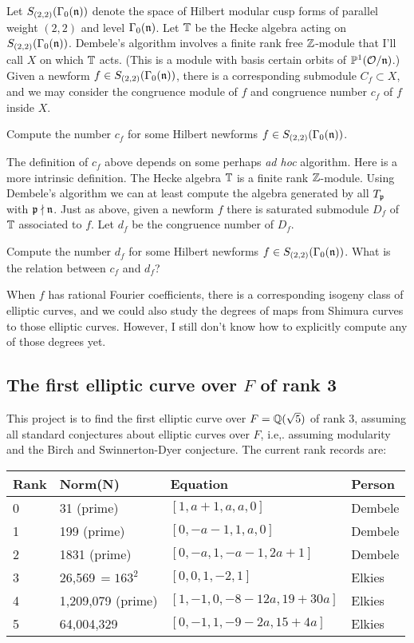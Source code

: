 \documentclass{article}
\begin{document}
Let $S_{(2,2)}(\Gamma_0(\mathfrak{n}))$ denote the space of Hilbert modular cusp forms of
parallel weight $(2,2)$ and level $\Gamma_0(\mathfrak{n})$.  Let $\mathbb{T}$ be the Hecke algebra
acting on $S_{(2,2)}(\Gamma_0(\mathfrak{n}))$.   Dembele's algorithm involves a finite
rank free $\mathbb{Z}$-module that I'll call $X$ on which $\mathbb{T}$ acts. 
(This is a module with basis certain orbits of $\mathbb{P}^1(\mathcal{O}/\mathfrak{n})$.)
Given a newform $f\in S_{(2,2)}(\Gamma_0(\mathfrak{n}))$, there is a corresponding
submodule $C_f \subset X$, and we may consider the congruence module
of $f$ 
and congruence number $c_f$ of $f$ inside $X$.

\vspace{1em}
 Compute the number $c_f$ for some Hilbert
newforms $f \in S_{(2,2)}(\Gamma_0(\mathfrak{n}))$.
\vspace{1em}


The definition of $c_f$ above depends on some perhaps {\em ad hoc}
algorithm.  Here is a more intrinsic definition.  The Hecke algebra
$\mathbb{T}$ is a finite rank $\mathbb{Z}$-module.  Using Dembele's algorithm we can
at least compute the algebra generated by all $T_{\mathfrak{p}}$ with
$\mathfrak{p}\nmid\mathfrak{n}$.  Just as above, given a newform $f$ there is saturated
submodule $D_f$ of $\mathbb{T}$ associated to $f$.  Let $d_f$ be the
congruence number of $D_f$.

\vspace{1em}
 Compute the number $d_f$ for some
Hilbert newforms $f \in S_{(2,2)}(\Gamma_0(\mathfrak{n}))$.  What is the relation between
$c_f$ and $d_f$?
\vspace{1em}


When $f$ has rational Fourier coefficients, there is a corresponding
isogeny class of elliptic curves, and we could also study the degrees
of maps from Shimura curves to those elliptic curves.   However, I still
don't know how to explicitly compute any of those degrees yet. 


\subsection{The first elliptic curve over $F$ of  rank 3}
This project is to find the first elliptic curve over $F=\mathbb{Q}(\sqrt{5})$
of rank 3, assuming all standard conjectures about elliptic curves
over $F$, i.e,. assuming modularity and the Birch and Swinnerton-Dyer
conjecture.  The current rank records are:
\begin{center}
\begin{tabular}{|l|l|l|l|}\hline
Rank & Norm(N) & Equation & Person\\\hline
0 & 31 (prime) &  $[1,a+1,a,a,0]$ &  Dembele \\
1 & 199 (prime) &  $[0,-a-1,1,a,0]$ &  Dembele \\
2 & 1831 (prime) &  $[0,-a,1,-a-1,2a+1]$ & Dembele \\
3 & 26,569$\,=163^2$ &  $[0,0,1,-2,1]$ & Elkies \\
4 & 1,209,079 (prime) & $[1, -1, 0, -8-12a, 19+30a]$ & Elkies \\
5 & 64,004,329 & $[0, -1, 1, -9-2a, 15+4a]$ & Elkies
\\\hline
\end{tabular}
\end{center}
\end{document}
